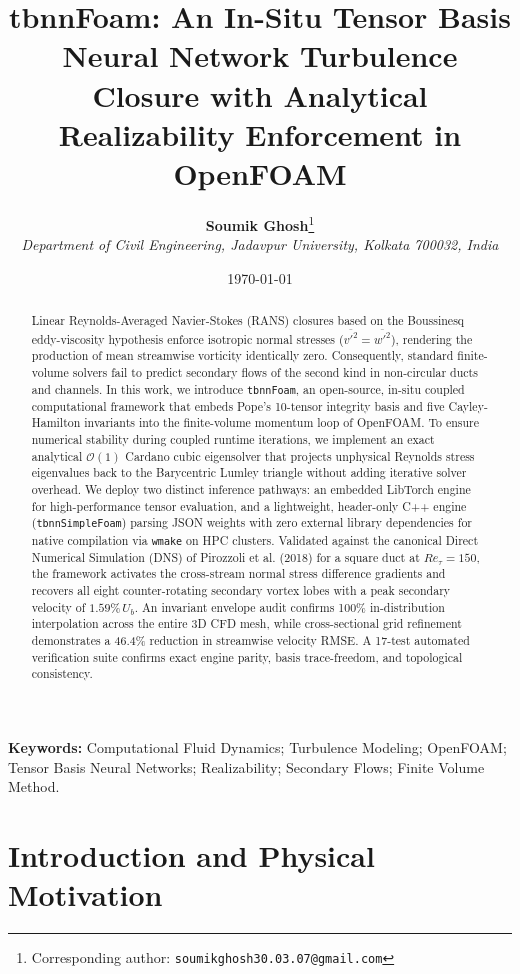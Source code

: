 \documentclass[11pt,a4paper]{article}
\title{\vspace{-1.5cm}\LARGE\textbf{\color{navyblue}tbnnFoam: An In-Situ Tensor Basis Neural Network Turbulence Closure with Analytical Realizability Enforcement in OpenFOAM}}
\author{
  \textbf{Soumik Ghosh}\thanks{Corresponding author: \texttt{soumikghosh30.03.07@gmail.com}} \\[0.5em]
  \textit{Department of Civil Engineering, Jadavpur University, Kolkata 700032, India}
}
\date{\today}
\begin{document}
\maketitle

\begin{abstract}
Linear Reynolds-Averaged Navier-Stokes (RANS) closures based on the Boussinesq eddy-viscosity hypothesis enforce isotropic normal stresses ($\overline{v'^2} = \overline{w'^2}$), rendering the production of mean streamwise vorticity identically zero. Consequently, standard finite-volume solvers fail to predict secondary flows of the second kind in non-circular ducts and channels. In this work, we introduce \texttt{tbnnFoam}, an open-source, in-situ coupled computational framework that embeds Pope's 10-tensor integrity basis and five Cayley-Hamilton invariants into the finite-volume momentum loop of OpenFOAM. To ensure numerical stability during coupled runtime iterations, we implement an exact analytical $\mathcal{O}(1)$ Cardano cubic eigensolver that projects unphysical Reynolds stress eigenvalues back to the Barycentric Lumley triangle without adding iterative solver overhead. We deploy two distinct inference pathways: an embedded LibTorch engine for high-performance tensor evaluation, and a lightweight, header-only C++ engine (\texttt{tbnnSimpleFoam}) parsing JSON weights with zero external library dependencies for native compilation via \texttt{wmake} on HPC clusters. Validated against the canonical Direct Numerical Simulation (DNS) of Pirozzoli et al. (2018) for a square duct at $Re_\tau = 150$, the framework activates the cross-stream normal stress difference gradients and recovers all eight counter-rotating secondary vortex lobes with a peak secondary velocity of $1.59\% \, U_b$. An invariant envelope audit confirms 100\% in-distribution interpolation across the entire 3D CFD mesh, while cross-sectional grid refinement demonstrates a 46.4\% reduction in streamwise velocity RMSE. A 17-test automated verification suite confirms exact engine parity, basis trace-freedom, and topological consistency.
\end{abstract}

\noindent\textbf{Keywords:} Computational Fluid Dynamics; Turbulence Modeling; OpenFOAM; Tensor Basis Neural Networks; Realizability; Secondary Flows; Finite Volume Method.

\section{Introduction and Physical Motivation}
\end{document}
